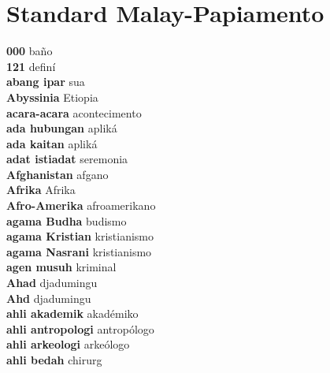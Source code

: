 \twocolumn
\chapter{Standard Malay-Papiamento}
\small
\raggedright
{}\textbf{ 000  } baño \\
\textbf{ 121  } definí \\
\textbf{ abang ipar  } sua \\
\textbf{ Abyssinia  } Etiopia \\
\textbf{ acara-acara  } acontecimento \\
\textbf{ ada hubungan  } apliká \\
\textbf{ ada kaitan  } apliká \\
\textbf{ adat istiadat  } seremonia \\
\textbf{ Afghanistan  } afgano \\
\textbf{ Afrika  } Afrika \\
\textbf{ Afro-Amerika  } afroamerikano \\
\textbf{ agama Budha  } budismo \\
\textbf{ agama Kristian  } kristianismo \\
\textbf{ agama Nasrani  } kristianismo \\
\textbf{ agen musuh  } kriminal \\
\textbf{ Ahad  } djadumingu \\
\textbf{ Ahd  } djadumingu \\
\textbf{ ahli akademik  } akadémiko \\
\textbf{ ahli antropologi  } antropólogo \\
\textbf{ ahli arkeologi  } arkeólogo \\
\textbf{ ahli bedah  } chirurg \\
